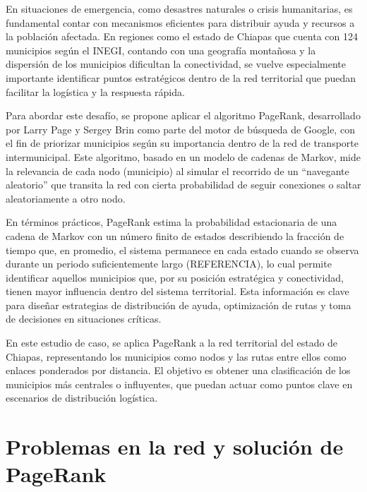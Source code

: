 \documentclass[
  letterpaper,
  DIV=11,
  numbers=noendperiod]{scrreprt}
\begin{document}
En situaciones de emergencia, como desastres naturales o crisis
humanitarias, es fundamental contar con mecanismos eficientes para
distribuir ayuda y recursos a la población afectada. En regiones como el
estado de Chiapas que cuenta con 124 municipios según el INEGI, contando
con una geografía montañosa y la dispersión de los municipios dificultan
la conectividad, se vuelve especialmente importante identificar puntos
estratégicos dentro de la red territorial que puedan facilitar la
logística y la respuesta rápida.

Para abordar este desafío, se propone aplicar el algoritmo PageRank,
desarrollado por Larry Page y Sergey Brin como parte del motor de
búsqueda de Google, con el fin de priorizar municipios según su
importancia dentro de la red de transporte intermunicipal. Este
algoritmo, basado en un modelo de cadenas de Markov, mide la relevancia
de cada nodo (municipio) al simular el recorrido de un ``navegante
aleatorio'' que transita la red con cierta probabilidad de seguir
conexiones o saltar aleatoriamente a otro nodo.

En términos prácticos, PageRank estima la probabilidad estacionaria de
una cadena de Markov con un número finito de estados describiendo la
fracción de tiempo que, en promedio, el sistema permanece en cada estado
cuando se observa durante un periodo suficientemente largo (REFERENCIA),
lo cual permite identificar aquellos municipios que, por su posición
estratégica y conectividad, tienen mayor influencia dentro del sistema
territorial. Esta información es clave para diseñar estrategias de
distribución de ayuda, optimización de rutas y toma de decisiones en
situaciones críticas.

En este estudio de caso, se aplica PageRank a la red territorial del
estado de Chiapas, representando los municipios como nodos y las rutas
entre ellos como enlaces ponderados por distancia. El objetivo es
obtener una clasificación de los municipios más centrales o influyentes,
que puedan actuar como puntos clave en escenarios de distribución
logística.

\section*{Problemas en la red y solución de
PageRank}\label{problemas-en-la-red-y-soluciuxf3n-de-pagerank}

\end{document}
